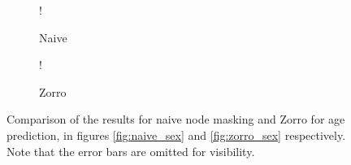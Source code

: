 \begin{figure}[H]
    \centering
        \begin{subfigure}{.5\textwidth}
            \centering
            \begin{center}
                \resizebox {1.0\linewidth} {!} {
                    
                }
            \end{center}
            \caption{Naive}
            \label{fig:comparison_age_naive}
        \end{subfigure}%
        \begin{subfigure}{.5\textwidth}
            \centering
            \begin{center}
                \resizebox {1.0\linewidth} {!} {
                    
                }
            \end{center}
            \caption{Zorro}
            \label{fig:comparison_age_zorro}
        \end{subfigure}
    \caption{Comparison of the results for naive node masking and Zorro for age prediction, in figures \ref{fig:naive_sex} and \ref{fig:zorro_sex} respectively. Note that the error bars are omitted for visibility.}
    \label{fig:comparison_age}
\end{figure}